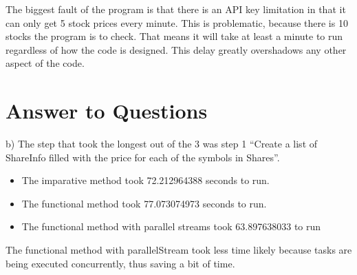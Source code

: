 \documentclass[letterpaper]{article}
\begin{document}
The biggest fault of the program is that there is an API key
limitation in that it can only get 5 stock prices every minute. This
is problematic, because there is 10 stocks the program is to
check. That means it will take at least a minute to run regardless of
how the code is designed. This delay greatly overshadows any other
aspect of the code.

\section{Answer to Questions}
b) The step that took the longest out of the 3 was step 1 ``Create a list of
ShareInfo filled with the price for each of the symbols in Shares''.

\begin{itemize}
  \item The imparative method took 72.212964388 seconds to run.
  \item The functional method took 77.073074973 seconds to run.
  \item The functional method with parallel streams took 63.897638033 to run 
\end{itemize}

The functional method with parallelStream took less time likely because tasks
are being executed concurrently, thus saving a bit of time.
\end{document}
